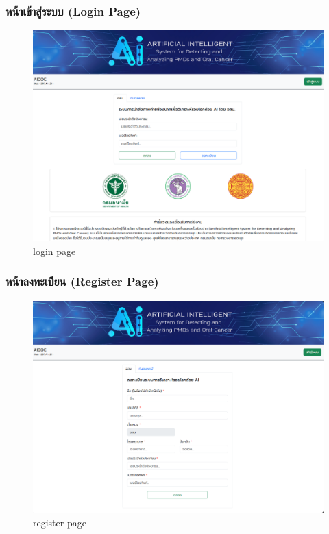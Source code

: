 \subsubsection{หน้าเข้าสู่ระบบ (Login Page)}
\begin{figure}[H]
  \centering
  \graphicspath{{./images/}}
  \includegraphics[scale=0.3]{login_volunteer.png}
  \caption{login page}
  \label{fig:login_volunteer}
\end{figure}

\subsubsection{หน้าลงทะเบียน (Register Page)}
\begin{figure}[H]
  \centering
  \graphicspath{{./images/}}
  \includegraphics[scale=0.3]{register_volunteer.png}
  \caption{register page}
  \label{fig:register_volunteer}
\end{figure}

